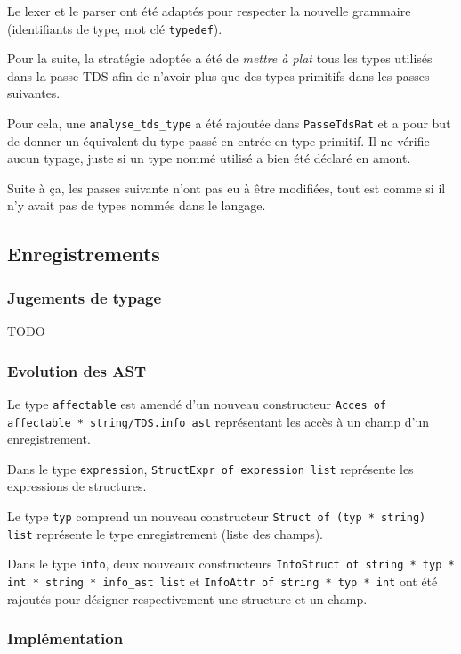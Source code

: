 \documentclass[headings=standardclasses,parskip=half]{scrartcl}
\begin{document}
Le lexer et le parser ont été adaptés pour respecter la nouvelle
grammaire (identifiants de type, mot clé \texttt{typedef}).

Pour la suite, la stratégie adoptée a été de \textit{mettre à plat}
tous les types utilisés dans la passe TDS afin de n'avoir plus que
des types primitifs dans les passes suivantes.

Pour cela, une \texttt{analyse\_tds\_type} a été rajoutée dans
\texttt{PasseTdsRat} et a pour but de donner un équivalent du type
passé en entrée en type primitif.
Il ne vérifie aucun typage, juste si un type nommé utilisé a bien été
déclaré en amont.

Suite à ça, les passes suivante n'ont pas eu à être modifiées, tout
est comme si il n'y avait pas de types nommés dans le langage.

\subsection{Enregistrements}

\subsubsection*{Jugements de typage}

TODO

\subsubsection*{Evolution des AST}

Le type \texttt{affectable} est amendé d'un nouveau constructeur
\texttt{Acces of affectable * string/TDS.info\_ast} représentant les
accès à un champ d'un enregistrement.

Dans le type \texttt{expression}, \texttt{StructExpr of expression list}
représente les expressions de structures.

Le type \texttt{typ} comprend un nouveau constructeur
\texttt{Struct of (typ * string) list} représente le type enregistrement
(liste des champs).

Dans le type \texttt{info}, deux nouveaux constructeurs
\texttt{InfoStruct of string * typ * int * string * info\_ast list} et
\texttt{InfoAttr of string * typ * int}
ont été rajoutés pour désigner respectivement une structure et un champ.

\subsubsection*{Implémentation}
\end{document}
